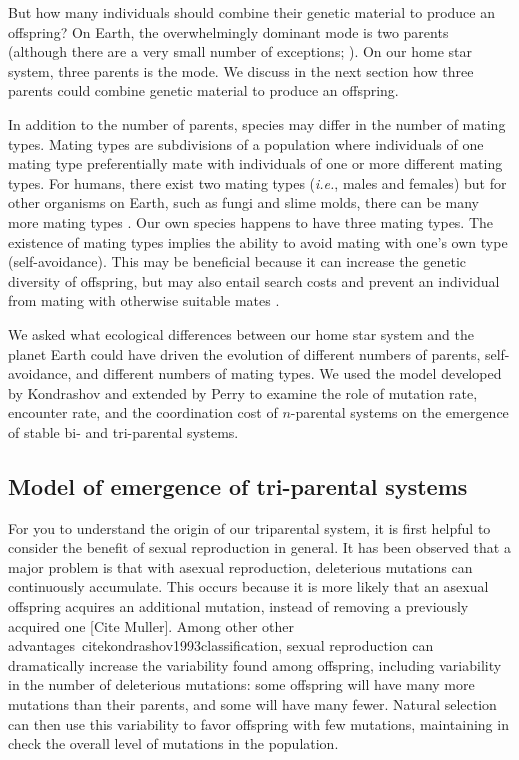 \documentclass{report}
\begin{document}
But how many individuals should combine their genetic material to produce an offspring? On Earth, the overwhelmingly dominant mode is two parents (although there are a very small number of exceptions; \cite{cohen2013biological,bloomfield2019triparental}). On our home star system, three parents is the mode. We discuss in the next section how three parents could combine genetic material to produce an offspring. 

In addition to the number of parents, species may differ in the number of mating types. Mating types are subdivisions of a population where individuals of one mating type preferentially mate with individuals of one or more different mating types. For humans, there exist two mating types (\emph{i.e.}, males and females) but for other organisms on Earth, such as fungi and slime molds, there can be many more mating types \cite{collins1977new}. Our own species happens to have three mating types. The existence of mating types implies the ability to avoid mating with one's own type (self-avoidance). This may be beneficial because it can increase the genetic diversity of offspring, but may also entail search costs and prevent an individual from mating with otherwise suitable mates \cite{bull_combinatorics_1989,iwasa_evolution_1987}. 

We asked what ecological differences between our home star system and the planet Earth could have driven the evolution of different numbers of parents, self-avoidance, and different numbers of mating types. We used the model developed by Kondrashov \cite{kondrashov_selection_1982} and extended by Perry \cite{perry2017sex} to examine the role of mutation rate, encounter rate, and the coordination cost of $n$-parental systems on the emergence of stable bi- and tri-parental systems.


\subsection*{Model of emergence of tri-parental systems} 
For you to understand the origin of our triparental system, it is first helpful to consider the benefit of sexual reproduction in general. It has been observed that a major problem is that with asexual reproduction, deleterious mutations can continuously accumulate. This occurs because it is more likely that an asexual offspring acquires an additional mutation, instead of removing a previously acquired one [Cite Muller]. Among other other advantages~cite{kondrashov1993classification}, sexual reproduction can dramatically increase the variability found among offspring, including variability in the number of deleterious mutations: some offspring will have many more mutations than their parents, and some will have many fewer. Natural selection can then use this variability to favor offspring with few mutations, maintaining in check the overall level of mutations in the population.
\end{document}
